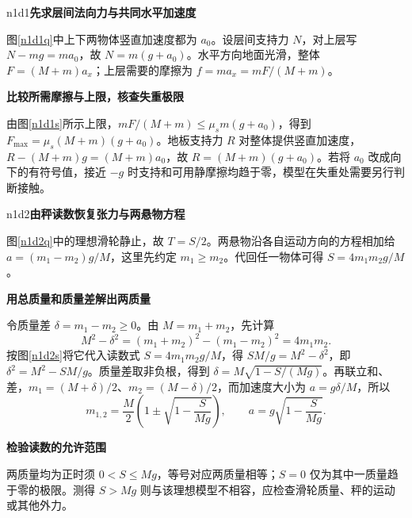 \LectureAnswerSection

\begin{drillsolution}{n1d1}\textbf{先求层间法向力与共同水平加速度}\par\nobreak
图\ref{n1d1q}中上下两物体竖直加速度都为 $a_0$。设层间支持力 $N$，对上层写 $N-mg=ma_0$，故 $N=m(g+a_0)$。水平方向地面光滑，整体 $F=(M+m)a_x$；上层需要的摩擦为 $f=ma_x=mF/(M+m)$。


\par\medskip{}\noindent\textbf{比较所需摩擦与上限，核查失重极限}\par\nobreak
由图\ref{n1d1s}所示上限，$mF/(M+m)\le\mu_s m(g+a_0)$，得到 $F_{\max}=\mu_s(M+m)(g+a_0)$。地板支持力 $R$ 对整体提供竖直加速度，$R-(M+m)g=(M+m)a_0$，故 $R=(M+m)(g+a_0)$。若将 $a_0$ 改成向下的有符号值，接近 $-g$ 时支持和可用静摩擦均趋于零，模型在失重处需要另行判断接触。
\end{drillsolution}

\begin{drillsolution}{n1d2}\textbf{由秤读数恢复张力与两悬物方程}\par\nobreak
图\ref{n1d2q}中的理想滑轮静止，故 $T=S/2$。两悬物沿各自运动方向的方程相加给 $a=(m_1-m_2)g/M$，这里先约定 $m_1\ge m_2$。代回任一物体可得 $S=4m_1m_2g/M$。


\par\medskip{}\noindent\textbf{用总质量和质量差解出两质量}\par\nobreak
令质量差 $\delta=m_1-m_2\ge0$。由 $M=m_1+m_2$，先计算
\[
 M^2-\delta^2=(m_1+m_2)^2-(m_1-m_2)^2=4m_1m_2.
\]
按图\ref{n1d2s}将它代入读数式 $S=4m_1m_2g/M$，得 $SM/g=M^2-\delta^2$，即 $\delta^2=M^2-SM/g$。质量差取非负根，得到 $\delta=M\sqrt{1-S/(Mg)}$。再联立和、差，$m_1=(M+\delta)/2$、$m_2=(M-\delta)/2$，而加速度大小为 $a=g\delta/M$，所以
\[
 m_{1,2}=\frac M2\left(1\pm\sqrt{1-\frac S{Mg}}\right),\qquad
 a=g\sqrt{1-\frac S{Mg}}.
\]


\par\medskip{}\noindent\textbf{检验读数的允许范围}\par\nobreak
两质量均为正时须 $0<S\le Mg$，等号对应两质量相等；$S=0$ 仅为其中一质量趋于零的极限。测得 $S>Mg$ 则与该理想模型不相容，应检查滑轮质量、秤的运动或其他外力。
\end{drillsolution}

